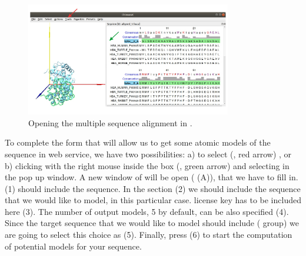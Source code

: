 \begin{itemize}
 \begin{figure}[H]
  \centering 
  \captionsetup{width=.7\linewidth} 
  \includegraphics[width=0.80\textwidth]{Images/Fig14}
  \caption{Opening the multiple sequence alignment in \chimera.}
  \label{fig:chimera_alignment}
  \end{figure}
\end{itemize}

To complete the form that will allow us to get some atomic models of the  sequence in \modeller web service, we have two possibilities: a) to select  (, red arrow) , or b) clicking with the right mouse inside the  box (, green arrow) and selecting  in the pop up window. A new window of  will be open ( (A)), that we have to fill in.  (1) should include the  sequence. In the  section (2) we should include the  sequence that we would like to model,  in this particular case. \modeller license key has to be included here (3). The number of output models, 5 by default, can be also specified (4). Since the target sequence that we would like to model should include  ( group) we are going to select this choice as  (5). Finally, press  (6) to start the computation of potential models for your  sequence.\\

